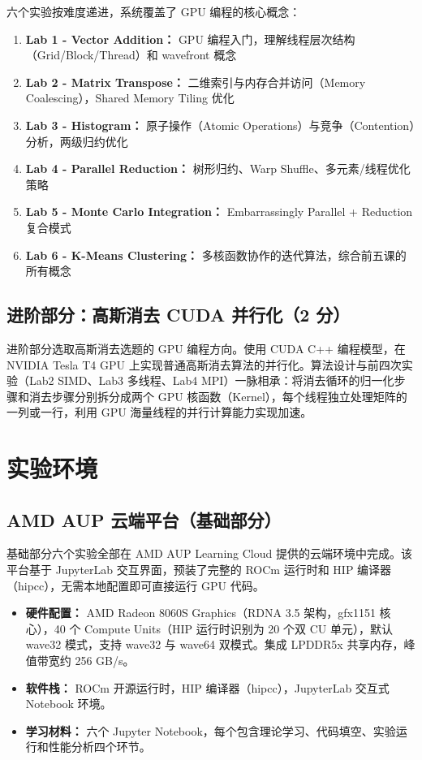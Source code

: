 \documentclass[a4paper]{article}
\begin{document}
六个实验按难度递进，系统覆盖了 GPU 编程的核心概念：

\begin{enumerate}
    \item \textbf{Lab 1 - Vector Addition：} GPU 编程入门，理解线程层次结构（Grid/Block/Thread）和 wavefront 概念
    \item \textbf{Lab 2 - Matrix Transpose：} 二维索引与内存合并访问（Memory Coalescing），Shared Memory Tiling 优化
    \item \textbf{Lab 3 - Histogram：} 原子操作（Atomic Operations）与竞争（Contention）分析，两级归约优化
    \item \textbf{Lab 4 - Parallel Reduction：} 树形归约、Warp Shuffle、多元素/线程优化策略
    \item \textbf{Lab 5 - Monte Carlo Integration：} Embarrassingly Parallel + Reduction 复合模式
    \item \textbf{Lab 6 - K-Means Clustering：} 多核函数协作的迭代算法，综合前五课的所有概念
\end{enumerate}

\subsection{进阶部分：高斯消去 CUDA 并行化（2 分）}

进阶部分选取高斯消去选题的 GPU 编程方向。使用 CUDA C++ 编程模型，在 NVIDIA Tesla T4 GPU 上实现普通高斯消去算法的并行化。算法设计与前四次实验（Lab2 SIMD、Lab3 多线程、Lab4 MPI）一脉相承：将消去循环的归一化步骤和消去步骤分别拆分成两个 GPU 核函数（Kernel），每个线程独立处理矩阵的一列或一行，利用 GPU 海量线程的并行计算能力实现加速。

\section{实验环境}

\subsection{AMD AUP 云端平台（基础部分）}

基础部分六个实验全部在 AMD AUP Learning Cloud 提供的云端环境中完成。该平台基于 JupyterLab 交互界面，预装了完整的 ROCm 运行时和 HIP 编译器（hipcc），无需本地配置即可直接运行 GPU 代码。

\begin{itemize}
    \item \textbf{硬件配置：} AMD Radeon 8060S Graphics（RDNA 3.5 架构，gfx1151 核心），40 个 Compute Units（HIP 运行时识别为 20 个双 CU 单元），默认 wave32 模式，支持 wave32 与 wave64 双模式。集成 LPDDR5x 共享内存，峰值带宽约 256 GB/s。
    \item \textbf{软件栈：} ROCm 开源运行时，HIP 编译器（hipcc），JupyterLab 交互式 Notebook 环境。
    \item \textbf{学习材料：} 六个 Jupyter Notebook，每个包含理论学习、代码填空、实验运行和性能分析四个环节。
\end{itemize}
\end{document}
